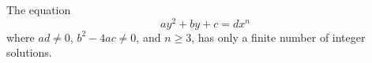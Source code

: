 \begin{proposition}
    The equation
\[
    ay^2+by+c=dx^n
\]
    where $ad\ne0$, $b^2-4ac\ne0$, and $n\ge3$, has only a finite number of integer solutions.
\end{proposition}
